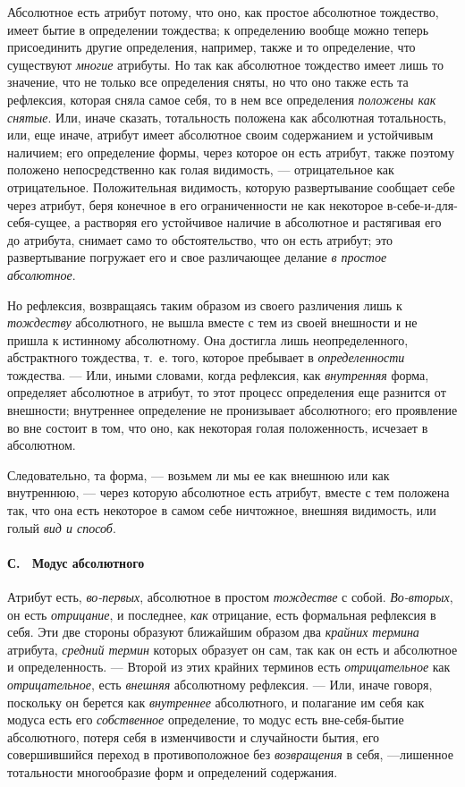 Абсолютное есть атрибут потому, что оно, как простое абсолютное тождество,
имеет бытие в определении тождества; к определению вообще можно теперь
присоединить другие определения, например, также и то определение, что
существуют {\em многие} атрибуты. Но так как абсолютное
тождество имеет лишь то значение, что не только все определения сняты, но
что оно также есть та рефлексия, которая сняла самое себя, то в нем все
определения {\em положены как снятые}. Или, иначе
сказать, тотальность положена как абсолютная тотальность, или, еще иначе,
атрибут имеет абсолютное своим содержанием и устойчивым наличием; его
определение формы, через которое он есть атрибут, также поэтому положено
непосредственно как голая видимость, — отрицательное как отрицательное.
Положительная видимость, которую развертывание сообщает себе через атрибут,
беря конечное в его ограниченности не как некоторое
в-себе-и-для-себя-сущее, а растворяя его устойчивое наличие в абсолютное и
растягивая его до атрибута, снимает само то обстоятельство, что он есть
атрибут; это развертывание погружает его и свое различающее делание
{\em в простое абсолютное}.

Но рефлексия, возвращаясь таким образом из своего различения лишь к
{\em тождеству} абсолютного, не вышла вместе с тем из
своей внешности и не пришла к истинному абсолютному. Она достигла лишь
неопределенного, абстрактного тождества, т.~е. того, которое пребывает в
{\em определенности} тождества. — Или, иными словами,
когда рефлексия, как {\em внутренняя} форма, определяет
абсолютное в атрибут, то этот процесс определения еще разнится от
внешности; внутреннее определение не пронизывает абсолютного; его
проявление во вне состоит в том, что оно, как некоторая голая положенность,
исчезает в абсолютном.

Следовательно, та форма, — возьмем ли мы ее как внешнюю или как внутреннюю,
— через которую абсолютное есть атрибут, вместе с тем положена так, что она
есть некоторое в самом себе ничтожное, внешняя видимость, или голый
{\em вид и способ}.

\paragraph[С. \ Модус абсолютного]{С. \ Модус абсолютного}
\hypertarget{Toc478978762}{}Атрибут есть,
{\em во-первых}, абсолютное в простом
{\em тождестве} с собой.
{\em Во-вторых}, он есть
{\em отрицание}, и последнее,
{\em как} отрицание, есть формальная рефлексия в себя.
Эти две стороны образуют ближайшим образом два
{\em крайних термина} атрибута,
{\em средний термин} которых образует он сам, так как
он есть и абсолютное и определенность. — Второй из этих крайних терминов
есть {\em отрицательное} как
{\em отрицательное}, есть
{\em внешняя} абсолютному рефлексия. — Или, иначе
говоря, поскольку он берется как {\em внутреннее}
абсолютного, и полагание им себя как модуса есть его
{\em собственное} определение, то модус есть
вне-себя-бытие абсолютного, потеря себя в изменчивости и случайности бытия,
его совершившийся переход в противоположное без
{\em возвращения} в себя, —лишенное тотальности
многообразие форм и определений содержания.

